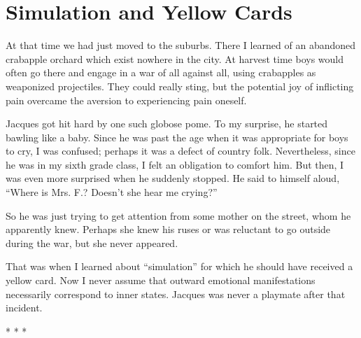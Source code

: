 \section{Simulation and Yellow Cards}

At that time we had just moved to the suburbs. There I learned of an abandoned crabapple orchard which exist nowhere in the city. At harvest time boys would often go there and engage in a war of all against all, using crabapples as weaponized projectiles. They could really sting, but the potential joy of inflicting pain overcame the aversion to experiencing pain oneself.

Jacques got hit hard by one such globose pome. To my surprise, he started bawling like a baby. Since he was past the age when it was appropriate for boys to cry, I was confused; perhaps it was a defect of country folk. Nevertheless, since he was in my sixth grade class, I felt an obligation to comfort him. But then, I was even more surprised when he suddenly stopped. He said to himself aloud, ``Where is Mrs. F.? Doesn't she hear me crying?''

So he was just trying to get attention from some mother on the street, whom he apparently knew. Perhaps she knew his ruses or was reluctant to go outside during the war, but she never appeared.

That was when I learned about ``simulation'' for which he should have received a yellow card. Now I never assume that outward emotional manifestations necessarily correspond to inner states. Jacques was never a playmate after that incident.



\begin{center}* * *\end{center}

